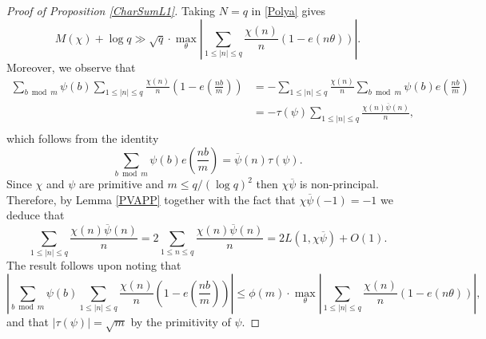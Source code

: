 \documentclass[12pt]{amsart}
\theoremstyle{definition}
\numberwithin{equation}{section}
\renewcommand{\bar}{\overline}
\begin{document}
\begin{proof}[Proof of Proposition \ref{CharSumL1}]
Taking $N=q$ in \eqref{Polya} gives
$$M(\chi)+\log q\gg \sqrt{q} \cdot \max_{\theta}\left|\sum_{1\leq |n|\leq q} \frac{\chi(n)}{n}
		\left(1-e\left(n \theta\right)\right)\right|.$$
Moreover,  we observe that
\begin{align*}
\sum_{b\bmod m} \psi(b) \sum_{1\leq |n|\leq q} \frac{\chi(n)}{n}\left(1-e\left(\frac{nb}{m}\right)\right)
&=-\sum_{1\leq |n|\leq q}\frac{\chi(n)}{n}\sum_{b\bmod m} \psi(b)e\left(\frac{nb}{m}\right)\\
&= -\tau(\psi)\sum_{1\leq |n|\leq q}\frac{\chi(n)\bar{\psi}(n)}{n},\\
\end{align*}
which follows from the identity
$$ \sum_{b\bmod m} \psi(b)e\left(\frac{nb}{m}\right)= \bar{\psi}(n)\tau(\psi).$$
Since $\chi$ and $\psi$ are primitive and $m\leq q/(\log q)^2$ then $\chi\bar{\psi}$ is non-principal. Therefore, by Lemma \ref{PVAPP} together with the fact that $\chi\bar{\psi}(-1)=-1$ we deduce that
$$ \sum_{1\leq |n|\leq q}\frac{\chi(n)\bar{\psi}(n)}{n}= 2 \sum_{1\leq n\leq q}\frac{\chi(n)\bar{\psi}(n)}{n}
= 2 L(1,\chi\bar{\psi})+O(1).$$
The result follows upon noting that
$$ \left|\sum_{b\bmod m} \psi(b) \sum_{1\leq |n|\leq q} \frac{\chi(n)}{n}\left(1-e\left(\frac{nb}{m}\right)\right)\right|\leq \phi(m) \cdot \max_{\theta}\left|\sum_{1\leq |n|\leq q} \frac{\chi(n)}{n}
		\left(1-e\left(n \theta\right)\right)\right|,
$$
and that $|\tau(\psi)| = \sqrt{m}$ by the primitivity of $\psi$.
\end{proof}
\end{document}
